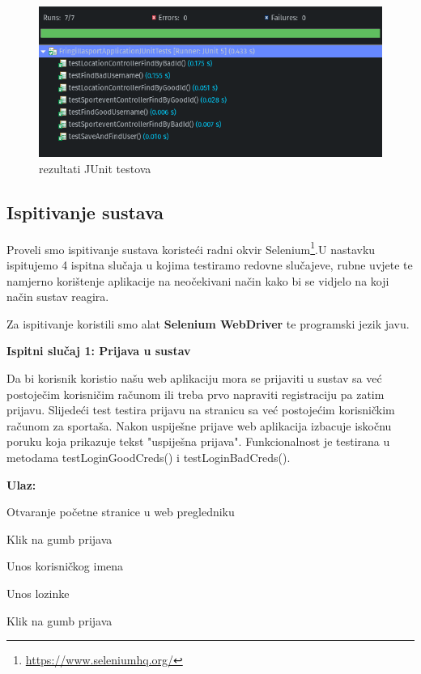 	\begin{figure}[H]
			\includegraphics[width=1\linewidth]{slike/JUnitTestovi.PNG}
			\centering
			\caption{rezultati JUnit testova}
			\label{fig:promjene}
		\end{figure}			
			
			\subsection{Ispitivanje sustava}
			
			 Proveli smo ispitivanje sustava koristeći radni okvir Selenium\footnote{\url{https://www.seleniumhq.org/}}.U nastavku ispitujemo 4 ispitna slučaja u kojima testiramo redovne slučajeve, rubne uvjete te namjerno korištenje aplikacije na neočekivani način kako bi se vidjelo na koji način sustav reagira.%
			 
			 Za ispitivanje koristili smo alat \textbf{Selenium WebDriver} te programski jezik javu.
			 
			 
			 \hfill\break
			 \noindent\textbf{Ispitni slučaj 1: Prijava u sustav}
			 
			 
			 Da bi korisnik koristio našu web aplikaciju mora se prijaviti u sustav sa već postoječim korisničim računom ili treba prvo napraviti registraciju pa zatim prijavu.
			 Slijedeći test testira prijavu na stranicu sa već postojećim korisničkim računom za sportaša. Nakon uspiješne prijave web aplikacija izbacuje iskočnu poruku koja prikazuje tekst "uspiješna prijava". Funkcionalnost je testirana u metodama testLoginGoodCreds() i testLoginBadCreds().
			 
			 
			 \hfill\break
			 \noindent\textbf{Ulaz:}
			 
			 \begin{packed_enum}
			 	
			 	\item Otvaranje početne stranice u web pregledniku
			 	\item Klik na gumb prijava
			 	\item Unos korisničkog imena
			 	\item Unos lozinke
			 	\item Klik na gumb prijava
			 	
			 	
			 	
			 \end{packed_enum}
			 
